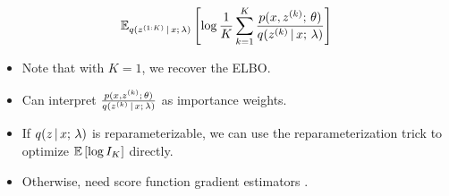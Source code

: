 \begin{frame}
\[ \mathbb{E}_{q(z^{(1:K)} \,|\, x ; \, \lambda)} \left[ \log \frac{1}{K} \sum_{k=1}^K \frac{p(x, z^{(k)} ; \, \theta)}{q(z^{(k)} \,|\, x ; \, \lambda)} \right] 
\]
    \begin{itemize}
      \item Note that with $K=1$, we recover the ELBO.
      \item Can interpret $\frac{p(x, z^{(k)} ; \, \theta)}{q(z^{(k)} \,|\, x ; \, \lambda)}$ as importance weights.
        \item If $q(z \,|\, x ; \, \lambda)$ is reparameterizable, we can use the reparameterization trick to optimize $\mathbb{E} \left[ \log I_K \right]$ directly.
        \item Otherwise, need score function gradient estimators \citep{Mnih2016}.
    \end{itemize}
\end{frame}


